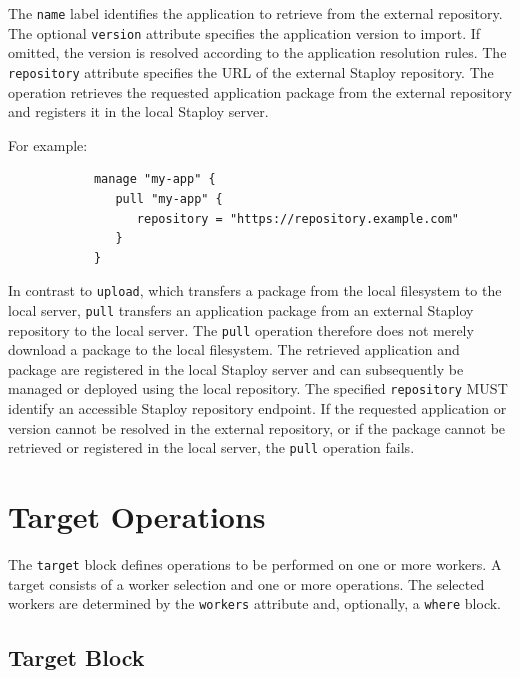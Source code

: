\documentclass[11pt,a4paper]{article}
\begin{document}
    The \texttt{name} label identifies the application to retrieve from the external repository.
    The optional \texttt{version} attribute specifies the application version to import.
    If omitted, the version is resolved according to the application resolution rules.
    The \texttt{repository} attribute specifies the URL of the external Staploy repository.
    The operation retrieves the requested application package from the external repository and registers it in the local Staploy server.

    For example:

    \begin{center}
        \begin{verbatim}
            manage "my-app" {
               pull "my-app" {
                  repository = "https://repository.example.com"
               }
            }
        \end{verbatim}
    \end{center}

    In contrast to \texttt{upload}, which transfers a package from the local filesystem to the local server, \texttt{pull} transfers an application package from an external Staploy repository to the local server.
    The \texttt{pull} operation therefore does not merely download a package to the local filesystem.
    The retrieved application and package are registered in the local Staploy server and can subsequently be managed or deployed using the local repository.
    The specified \texttt{repository} MUST identify an accessible Staploy repository endpoint.
    If the requested application or version cannot be resolved in the external repository, or if the package cannot be retrieved or registered in the local server, the \texttt{pull} operation fails.


    \section{Target Operations}\label{sec:target-operations}

    The \texttt{target} block defines operations to be performed on one or more workers.
    A target consists of a worker selection and one or more operations.
    The selected workers are determined by the \texttt{workers} attribute and, optionally, a \texttt{where} block.

    \subsection{Target Block}\label{subsec:target-block}
\end{document}
